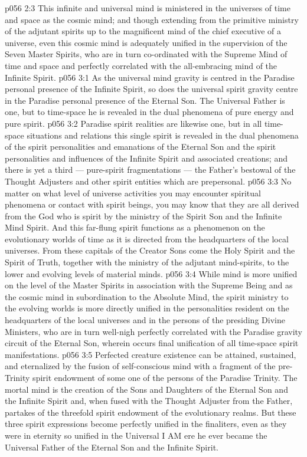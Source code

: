 \vs p056 2:3 This infinite and universal mind is ministered in the universes of time and space as the cosmic mind; and though extending from the primitive ministry of the adjutant spirits up to the magnificent mind of the chief executive of a universe, even this cosmic mind is adequately unified in the supervision of the Seven Master Spirits, who are in turn co\hyp{}ordinated with the Supreme Mind of time and space and perfectly correlated with the all\hyp{}embracing mind of the Infinite Spirit.
\vs p056 3:1 As the universal mind gravity is centred in the Paradise personal presence of the Infinite Spirit, so does the universal spirit gravity centre in the Paradise personal presence of the Eternal Son. The Universal Father is one, but to time\hyp{}space he is revealed in the dual phenomena of pure energy and pure spirit.
\vs p056 3:2 Paradise spirit realities are likewise one, but in all time\hyp{}space situations and relations this single spirit is revealed in the dual phenomena of the spirit personalities and emanations of the Eternal Son and the spirit personalities and influences of the Infinite Spirit and associated creations; and there is yet a third --- pure\hyp{}spirit fragmentations --- the Father’s bestowal of the Thought Adjusters and other spirit entities which are prepersonal.
\vs p056 3:3 \pc No matter on what level of universe activities you may encounter spiritual phenomena or contact with spirit beings, you may know that they are all derived from the God who is spirit by the ministry of the Spirit Son and the Infinite Mind Spirit. And this far\hyp{}flung spirit functions as a phenomenon on the evolutionary worlds of time as it is directed from the headquarters of the local universes. From these capitals of the Creator Sons come the Holy Spirit and the Spirit of Truth, together with the ministry of the adjutant mind\hyp{}spirits, to the lower and evolving levels of material minds.
\vs p056 3:4 While mind is more unified on the level of the Master Spirits in association with the Supreme Being and as the cosmic mind in subordination to the Absolute Mind, the spirit ministry to the evolving worlds is more directly unified in the personalities resident on the headquarters of the local universes and in the persons of the presiding Divine Ministers, who are in turn well\hyp{}nigh perfectly correlated with the Paradise gravity circuit of the Eternal Son, wherein occurs final unification of all time\hyp{}space spirit manifestations.
\vs p056 3:5 \pc Perfected creature existence can be attained, sustained, and eternalized by the fusion of self\hyp{}conscious mind with a fragment of the pre\hyp{}Trinity spirit endowment of some one of the persons of the Paradise Trinity. The mortal mind is the creation of the Sons and Daughters of the Eternal Son and the Infinite Spirit and, when fused with the Thought Adjuster from the Father, partakes of the threefold spirit endowment of the evolutionary realms. But these three spirit expressions become perfectly unified in the finaliters, even as they were in eternity so unified in the Universal I AM ere he ever became the Universal Father of the Eternal Son and the Infinite Spirit.
